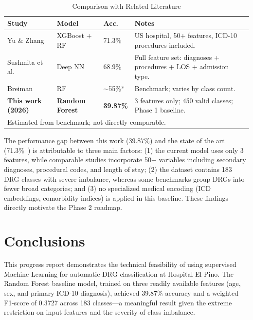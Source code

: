 \documentclass{IEEEtran}
\begin{document}
\begin{table}[htbp]
\caption{Comparison with Related Literature}
\label{tab:literature}
\centering
\renewcommand{\arraystretch}{1.3}
\begin{tabular}{p{1.6cm}p{1.2cm}p{0.9cm}p{2.7cm}}
\toprule
\textbf{Study} & \textbf{Model} & \textbf{Acc.} & \textbf{Notes} \\
\midrule
Yu \& Zhang~\cite{yu2022} &
XGBoost + RF & 71.3\% &
US hospital, 50+ features, ICD-10 procedures included. \\
\midrule
Sushmita et al.~\cite{sushmita2021} &
Deep NN & 68.9\% &
Full feature set: diagnoses + procedures + LOS + admission type. \\
\midrule
Breiman~\cite{breiman2001} &
RF & $\sim$55\%* &
Benchmark; varies by class count. \\
\midrule
\textbf{This work (2026)} &
\textbf{Random Forest} & \textbf{39.87\%} &
3 features only; 450 valid classes; Phase 1 baseline. \\
\bottomrule
\multicolumn{4}{l}{\footnotesize *Estimated from benchmark; not directly comparable.}
\end{tabular}
\end{table}

The performance gap between this work (39.87\%) and the state of the art (71.3\%~\cite{yu2022}) is attributable to three main factors: (1) the current model uses only 3 features, while comparable studies incorporate 50+ variables including secondary diagnoses, procedural codes, and length of stay; (2) the dataset contains 183 DRG classes with severe imbalance, whereas some benchmarks group DRGs into fewer broad categories; and (3) no specialized medical encoding (ICD embeddings, comorbidity indices) is applied in this baseline. These findings directly motivate the Phase 2 roadmap.

\section{Conclusions}

This progress report demonstrates the technical feasibility of using supervised Machine Learning for automatic DRG classification at Hospital El Pino. The Random Forest baseline model, trained on three readily available features (age, sex, and primary ICD-10 diagnosis), achieved 39.87\% accuracy and a weighted F1-score of 0.3727 across 183 classes---a meaningful result given the extreme restriction on input features and the severity of class imbalance.
\end{document}
